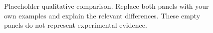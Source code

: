 \begin{figure}[t]
  \centering
  \hfill
  \caption{Placeholder qualitative comparison. Replace both panels with
  your own examples and explain the relevant differences. These empty
  panels do not represent experimental evidence.}
  \label{fig:qualitative}
\end{figure}
